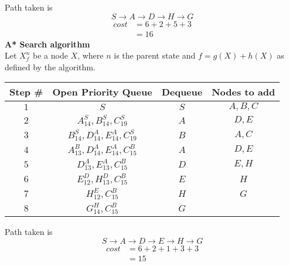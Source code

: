 \begin{enumerate}
        Path taken is
        $$
          S \rightarrow A \rightarrow D \rightarrow H \rightarrow G
        $$
        \begin{align*}
          cost & = 6 + 2 + 5 + 3 \\
               & = 16
        \end{align*}
        \textbf{A* Search algorithm}\\
        Let $X^n_f$ be a node $X$, where $n$ is the parent state and $f=g(X) + h(X)$ as defined by the algorithm.
        \begin{center}
          \bgroup
          \def\arraystretch{1.5}%
          \begin{tabular}{|c|c|c|c|}
            \hline
            Step \# & Open Priority Queue                      & Dequeue & Nodes to add \\
            \hline
            $1$     & $S$                                      & $S$     & $A,B,C$      \\
            $2$     & $A^S_{14}, B^S_{14}, C^S_{19}$           & $A$     & $D,E$        \\
            $3$     & $B^S_{14}, D^A_{14}, E^A_{14}, C^S_{19}$ & $B$     & $A,C$        \\
            $4$     & $A^B_{13}, D^A_{14}, E^A_{14}, C^B_{15}$ & $A$     & $D,E$        \\
            $5$     & $D^A_{13}, E^A_{13}, C^B_{15}$           & $D$     & $E,H$        \\
            $6$     & $E^D_{12}, H^D_{13}, C^B_{15}$           & $E$     & $H$          \\
            $7$     & $H^E_{12}, C^B_{15}$                     & $H$     & $G$          \\
            $8$     & $G^H_{14}, C^B_{15}$                     & $G$     &              \\
            \hline
          \end{tabular}
          \egroup
        \end{center}
        Path taken is
        $$
          S \rightarrow A \rightarrow D \rightarrow E \rightarrow H \rightarrow G
        $$
        \begin{align*}
          cost & = 6 + 2 + 1 + 3 + 3 \\
               & = 15
        \end{align*}
\end{enumerate}